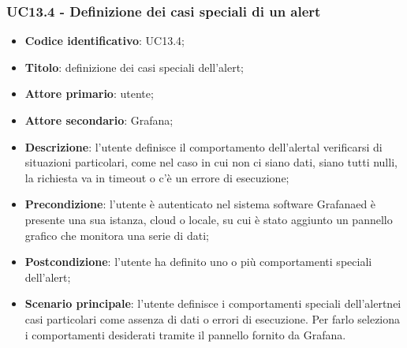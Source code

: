 \subsubsection{UC13.4 - Definizione dei casi speciali di un alert}
	\begin{itemize}
	\item \textbf{Codice identificativo}: UC13.4;
	\item \textbf{Titolo}: definizione dei casi speciali dell'alert\glo;
	\item \textbf{Attore primario}: utente;
	\item \textbf{Attore secondario}: Grafana\glo;
	\item \textbf{Descrizione}: l'utente definisce il comportamento dell'alert\glosp al verificarsi di situazioni particolari, come nel caso in cui non ci siano dati, siano tutti nulli, la richiesta va in timeout o c'è un errore di esecuzione;
	\item \textbf{Precondizione}: l'utente è autenticato nel sistema software Grafana\glosp ed è presente una sua istanza, cloud o locale, su cui è stato aggiunto un pannello grafico che monitora una serie di dati;
	\item \textbf{Postcondizione}: l'utente ha definito uno o più comportamenti speciali dell'alert\glo;
	\item \textbf{Scenario principale}: l'utente definisce i comportamenti speciali dell'alert\glosp nei casi particolari come assenza di dati o errori di esecuzione. Per farlo seleziona i comportamenti desiderati tramite il pannello fornito da Grafana\glo.
\end{itemize} 
